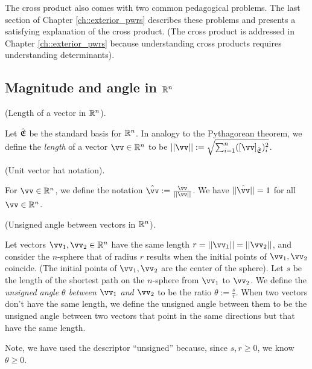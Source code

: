 \vspace{.5cm}

The cross product also comes with two common pedagogical problems. The last section of Chapter \ref{ch::exterior_pwrs} describes these problems and presents a satisfying explanation of the cross product. (The cross product is addressed in Chapter \ref{ch::exterior_pwrs} because understanding cross products requires understanding determinants).

\subsection*{Magnitude and angle in $\mathbb{R}^n$}
\label{ch::lin_alg::subsection::mag_and_angle_Rn}

\begin{defn}
\label{ch::lin_alg::defn::length_in_Rn}
    (Length of a vector in $\mathbb{R}^n$). 
    
    Let ${\hat{\mathfrak{E}}}$ be the standard basis for $\mathbb{R}^n$. In analogy to the Pythagorean theorem, we define the \textit{length} of a vector $\vv \in \R^n$ to be $||\vv|| := \sqrt{\sum_{i = 1}^n ([\vv]_\sE)_i^2}$.
\end{defn}

\begin{defn}
    (Unit vector hat notation). 
    
    For $\vv \in \R^n$, we define the notation $\hat{\vv} := \frac{\vv}{||\vv||}$. We have $||\hat{\vv}|| = 1$ for all $\vv \in \R^n$.
\end{defn}

\begin{defn}
    (Unsigned angle between vectors in $\mathbb{R}^n$).
    
    Let vectors $\vv_1, \vv_2 \in \R^n$ have the same length $r = ||\vv_1|| = ||\vv_2||$, and consider the $n$-sphere that of radius $r$ results when the initial points of $\vv_1, \vv_2$ coincide. (The initial points of $\vv_1, \vv_2$ are the center of the sphere). Let $s$ be the length of the shortest path on the $n$-sphere from $\vv_1$ to $\vv_2$. We define the \textit{unsigned angle $\theta$ between $\vv_1$ and $\vv_2$} to be the ratio $\theta := \frac{s}{r}$. When two vectors don't have the same length, we define the unsigned angle between them to be the unsigned angle between two vectors that point in the same directions but that have the same length.
    
    Note, we have used the descriptor ``unsigned'' because, since $s, r \geq 0$, we know $\theta \geq 0$.
\end{defn}

